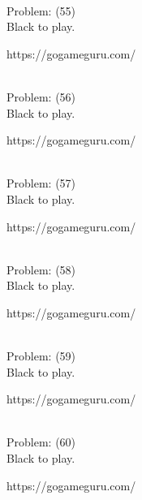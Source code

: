 \documentclass[11pt]{article}
\begin{document}
\begin{minipage}[t]{0.5\textwidth}
  {\centering
  
\\
  Problem: (55)\\
  Black to play.

https://gogameguru.com/\\
  }
\end{minipage}
\begin{minipage}[t]{0.5\textwidth}
  {\centering
  
\\
  Problem: (56)\\
  Black to play.

https://gogameguru.com/\\
  }
\end{minipage}
\begin{minipage}[t]{0.5\textwidth}
  {\centering
  
\\
  Problem: (57)\\
  Black to play.

https://gogameguru.com/\\
  }
\end{minipage}
\begin{minipage}[t]{0.5\textwidth}
  {\centering
  
\\
  Problem: (58)\\
  Black to play.

https://gogameguru.com/\\
  }
\end{minipage}
\begin{minipage}[t]{0.5\textwidth}
  {\centering
  
\\
  Problem: (59)\\
  Black to play.

https://gogameguru.com/\\
  }
\end{minipage}
\begin{minipage}[t]{0.5\textwidth}
  {\centering
  
\\
  Problem: (60)\\
  Black to play.

https://gogameguru.com/\\
  }
\end{minipage}
\end{document}
